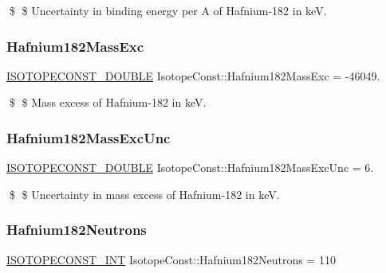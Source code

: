 \$ \$ Uncertainty in binding energy per A of Hafnium-\/182 in keV. \mbox{\label{group___isotope_const-_hafnium-_hf182_ga7b9a8e913aa790181a5f8e7431c7b26d}} 
\subsubsection{\texorpdfstring{Hafnium182\+Mass\+Exc}{Hafnium182MassExc}}
{\footnotesize\ttfamily \mbox{\hyperlink{group___isotope_const-_macros_ga8f45a7272ce02c0b4c65c44636ed719a}{I\+S\+O\+T\+O\+P\+E\+C\+O\+N\+S\+T\+\_\+\+D\+O\+U\+B\+LE}} Isotope\+Const\+::\+Hafnium182\+Mass\+Exc = -\/46049.}

\$ \$ Mass excess of Hafnium-\/182 in keV. \mbox{\label{group___isotope_const-_hafnium-_hf182_ga6b60bbaaa3ab13efe3e06990789cf5bb}} 
\subsubsection{\texorpdfstring{Hafnium182\+Mass\+Exc\+Unc}{Hafnium182MassExcUnc}}
{\footnotesize\ttfamily \mbox{\hyperlink{group___isotope_const-_macros_ga8f45a7272ce02c0b4c65c44636ed719a}{I\+S\+O\+T\+O\+P\+E\+C\+O\+N\+S\+T\+\_\+\+D\+O\+U\+B\+LE}} Isotope\+Const\+::\+Hafnium182\+Mass\+Exc\+Unc = 6.}

\$ \$ Uncertainty in mass excess of Hafnium-\/182 in keV. \mbox{\label{group___isotope_const-_hafnium-_hf182_gae81f9a32bcfcb0311eedac863e6f97e0}} 
\subsubsection{\texorpdfstring{Hafnium182\+Neutrons}{Hafnium182Neutrons}}
{\footnotesize\ttfamily \mbox{\hyperlink{group___isotope_const-_macros_ga5f18360b3e99483a35c32d789e62621c}{I\+S\+O\+T\+O\+P\+E\+C\+O\+N\+S\+T\+\_\+\+I\+NT}} Isotope\+Const\+::\+Hafnium182\+Neutrons = 110}

